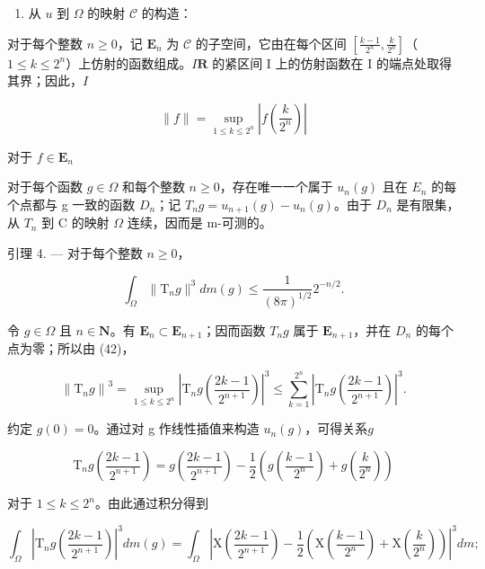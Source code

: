 \begin{enumerate}
\def\labelenumi{\Alph{enumi})}
\setcounter{enumi}{1}
\tightlist
\item
  从 \(u\) 到 \(\Omega\) 的映射 \(\mathcal{C}\) 的构造：
\end{enumerate}

对于每个整数 \(n \geqslant 0\)，记 \(\mathbf{E}_n\) 为 \(\mathcal{C}\) 的子空间，它由在每个区间 \(\left[\frac{k - 1}{2^n}, \frac{k}{2^n}\right]\)（\(1 \leqslant k \leqslant 2^n\)）上仿射的函数组成。\(I\)\(\mathbf{R}\) 的紧区间 I 上的仿射函数在 I 的端点处取得其界；因此，\(I\)

\[
\| f \| = \sup _ {1 \leqslant k \leqslant 2 ^ {n}} \left| f \left(\frac {k}{2 ^ {n}}\right) \right|\tag{42}
\]

对于 \(f\in \mathbf{E}_n\)

对于每个函数 \(g \in \Omega\) 和每个整数 \(n \geqslant 0\)，存在唯一一个属于 \(u_{n}(g)\) 且在 \(E_{n}\) 的每个点都与 g 一致的函数 \(D_{n}\)；记 \(T_{n}g = u_{n+1}(g) - u_{n}(g)\)。由于 \(D_{n}\) 是有限集，从 \(T_{n}\) 到 C 的映射 \(\Omega\) 连续，因而是 m-可测的。

引理 4. --- 对于每个整数 \(n \geqslant 0\)，

\[
\int_ {\Omega} \| \mathrm{T} _ {n} g \| ^ {3} d m (g) \leqslant \frac {1}{(8 \pi) ^ {1 / 2}} 2 ^ {- n / 2}.\tag{43}
\]

令 \(g \in \Omega\) 且 \(n \in \mathbf{N}\)。有 \(\mathbf{E}_n \subset \mathbf{E}_{n+1}\)；因而函数 \(T_n g\) 属于 \(\mathbf{E}_{n+1}\)，并在 \(D_n\) 的每个点为零；所以由 (42)，

\[
\left\| \mathrm{T} _ {n} g \right\| ^ {3} = \sup _ {1 \leqslant k \leqslant 2 ^ {n}} \left| \mathrm{T} _ {n} g \left(\frac {2 k - 1}{2 ^ {n + 1}}\right) \right| ^ {3} \leqslant \sum_ {k = 1} ^ {2 ^ {n}} \left| \mathrm{T} _ {n} g \left(\frac {2 k - 1}{2 ^ {n + 1}}\right) \right| ^ {3}.\tag{44}
\]

约定 \(g(0) = 0\)。通过对 g 作线性插值来构造 \(u_{n}(g)\)，可得关系\(g\)

\[
\mathrm{T} _ {n} g \left(\frac {2 k - 1}{2 ^ {n + 1}}\right) = g \left(\frac {2 k - 1}{2 ^ {n + 1}}\right) - \frac {1}{2} \left(g \left(\frac {k - 1}{2 ^ {n}}\right) + g \left(\frac {k}{2 ^ {n}}\right)\right)\tag{45}
\]

对于 \(1 \leqslant k \leqslant 2^n\)。由此通过积分得到

\[
\int_ {\Omega} \left| \mathrm{T} _ {n} g \left(\frac {2 k - 1}{2 ^ {n + 1}}\right) \right| ^ {3} d m (g) = \int_ {\Omega} \left| \mathrm{X} \left(\frac {2 k - 1}{2 ^ {n + 1}}\right) - \frac {1}{2} \left(\mathrm{X} \left(\frac {k - 1}{2 ^ {n}}\right) + \mathrm{X} \left(\frac {k}{2 ^ {n}}\right)\right) \right| ^ {3} d m;
\]

